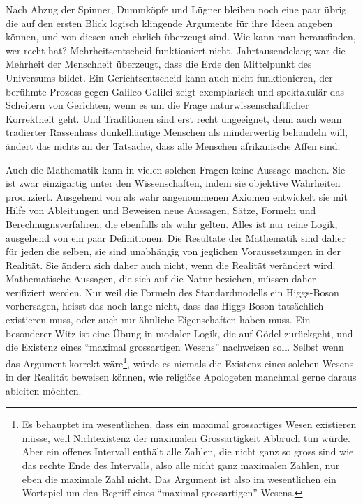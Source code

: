 Nach Abzug der Spinner, Dummköpfe und Lügner bleiben noch eine
paar übrig, die auf den ersten Blick logisch klingende Argumente
für ihre Ideen angeben können, und von diesen auch ehrlich 
überzeugt sind.
Wie kann man herausfinden, wer recht hat?
Mehrheitsentscheid funktioniert nicht, Jahrtausendelang war
die Mehrheit der Menschheit überzeugt, dass die Erde den Mittelpunkt
des Universums bildet.
Ein Gerichtsentscheid kann auch nicht funktionieren, der berühmte
Prozess gegen Galileo Galilei zeigt exemplarisch und spektakulär
das Scheitern von Gerichten, wenn es um die Frage naturwissenschaftlicher
Korrektheit geht.
Und Traditionen sind erst recht ungeeignet, denn auch wenn tradierter Rassenhass
dunkelhäutige Menschen als minderwertig behandeln will, ändert das
nichts an der Tatsache, dass alle Menschen afrikanische Affen sind.

Auch die Mathematik kann in vielen solchen Fragen keine Aussage machen.
Sie ist zwar einzigartig unter den Wissenschaften, indem
sie objektive Wahrheiten produziert.
Ausgehend von als wahr angenommenen Axiomen entwickelt sie mit 
Hilfe von Ableitungen und Beweisen neue Aussagen, Sätze, Formeln
und Berechnugnsverfahren, die ebenfalls als wahr gelten.
Alles ist nur reine Logik, ausgehend von ein paar Definitionen.
Die Resultate der Mathematik sind daher für jeden die selben, 
sie sind unabhängig von jeglichen Voraussetzungen in der Realität.
Sie ändern sich daher auch nicht, wenn die Realität verändert wird.
Mathematische Aussagen, die sich auf die Natur beziehen, müssen daher
verifiziert werden.
Nur weil die Formeln des Standardmodells ein Higgs-Boson vorhersagen,
heisst das noch lange nicht, dass das Higgs-Boson tatsächlich existieren
muss, oder auch nur ähnliche Eigenschaften haben muss.
Ein besonderer Witz ist eine Übung in modaler Logik, die auf Gödel
zurückgeht, und die Existenz eines ``maximal grossartigen Wesens'' 
nachweisen soll. 
Selbst wenn das Argument korrekt wäre\footnote{Es behauptet im wesentlichen,
dass ein maximal grossartiges Wesen existieren müsse, weil Nichtexistenz
der maximalen Grossartigkeit Abbruch tun würde.
Aber ein offenes Intervall enthält alle Zahlen, die nicht ganz so gross
sind wie das rechte Ende des Intervalls, also alle nicht ganz maximalen
Zahlen, nur eben die maximale Zahl nicht.
Das Argument ist also im wesentlichen ein Wortspiel um den Begriff eines
``maximal grossartigen'' Wesens.}, würde es niemals die Existenz eines
solchen Wesens in der Realität beweisen können, wie religiöse
Apologeten manchmal gerne daraus ableiten möchten.

